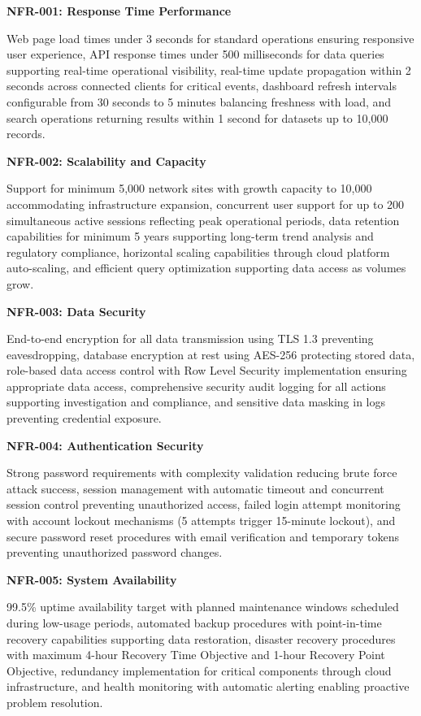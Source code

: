 \textbf{NFR-001: Response Time Performance}

Web page load times under 3 seconds for standard operations ensuring responsive user experience, API response times under 500 milliseconds for data queries supporting real-time operational visibility, real-time update propagation within 2 seconds across connected clients for critical events, dashboard refresh intervals configurable from 30 seconds to 5 minutes balancing freshness with load, and search operations returning results within 1 second for datasets up to 10,000 records.

\textbf{NFR-002: Scalability and Capacity}

Support for minimum 5,000 network sites with growth capacity to 10,000 accommodating infrastructure expansion, concurrent user support for up to 200 simultaneous active sessions reflecting peak operational periods, data retention capabilities for minimum 5 years supporting long-term trend analysis and regulatory compliance, horizontal scaling capabilities through cloud platform auto-scaling, and efficient query optimization supporting data access as volumes grow.

\textbf{NFR-003: Data Security}

End-to-end encryption for all data transmission using TLS 1.3 preventing eavesdropping, database encryption at rest using AES-256 protecting stored data, role-based data access control with Row Level Security implementation ensuring appropriate data access, comprehensive security audit logging for all actions supporting investigation and compliance, and sensitive data masking in logs preventing credential exposure.

\textbf{NFR-004: Authentication Security}

Strong password requirements with complexity validation reducing brute force attack success, session management with automatic timeout and concurrent session control preventing unauthorized access, failed login attempt monitoring with account lockout mechanisms (5 attempts trigger 15-minute lockout), and secure password reset procedures with email verification and temporary tokens preventing unauthorized password changes.

\textbf{NFR-005: System Availability}

99.5\% uptime availability target with planned maintenance windows scheduled during low-usage periods, automated backup procedures with point-in-time recovery capabilities supporting data restoration, disaster recovery procedures with maximum 4-hour Recovery Time Objective and 1-hour Recovery Point Objective, redundancy implementation for critical components through cloud infrastructure, and health monitoring with automatic alerting enabling proactive problem resolution.

